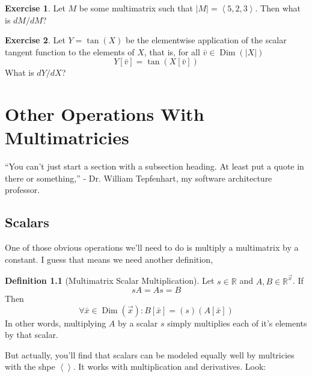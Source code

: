 \documentclass[12pt]{book}
\theoremstyle{plain}
\theoremstyle{definition}
\newtheorem{definition}{Definition}[chapter]
\newtheorem{exercise}{Exercise}[chapter]
\theoremstyle{ppart}
\theoremstyle{case}
\theoremstyle{solution}
\DeclareMathOperator{\Dim}{Dim}
\begin{document}
\begin{exercise}
Let $M$ be some multimatrix such that $|M| = \left<5,2,3\right>$. Then what is
$dM/dM$?
\end{exercise}

\begin{exercise}
Let $Y = \tan(X)$ be the elementwise application of the scalar tangent function to
the elements of $X$, that is, for all $\bar{v} \in \Dim(|X|)$
\[ Y[\bar{v}] = \tan(X[\bar{v}]) \]
What is $dY/dX$?
\end{exercise}

\chapter{Other Operations With Multimatricies}

\begin{displayquote}
``You can't just start a section with a subsection heading. At least put a quote
in there or something,'' - Dr. William Tepfenhart, my software architecture professor.
\end{displayquote}

\section{Scalars}

One of those obvious operations we'll need to do is multiply
a multimatrix by a constant. I guess that means we need another definition,

\begin{definition}[Multimatrix Scalar Multiplication]
Let $s \in \mathbb{R}$ and $A, B \in \mathbb{R}^{\vec{x}}$. If
\[ sA = As = B \]
Then
\[ \forall \bar{x} \in \Dim(\vec{x}):
   B[\bar{x}] = (s)(A[\bar{x}]) \]
In other words, multiplying $A$ by a scalar $s$ simply multiplies each of
it's elements by that scalar.
\end{definition}

But actually, you'll find that scalars can be modeled equally well by multricies
with the shpe $\left<\right>$. It works with multiplication and derivatives. Look:
\end{document}
